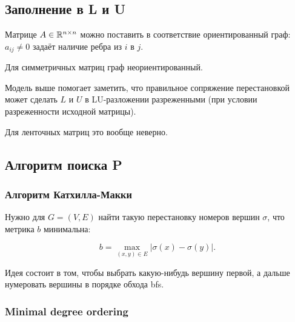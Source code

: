 \subsection{Заполнение в L и U}

Матрице $A \in \mathbb{R}^{n \times n}$ можно поставить в соответствие ориентированный
граф: $a_{ij} \ne 0$ задаёт наличие ребра из $i$ в $j$.

Для симметричных матриц граф неориентированный.

Модель выше помогает заметить, что правильное сопряжение перестановкой может
сделать $L$ и $U$ в LU-разложении разреженными (при условии разреженности
исходной матрицы).

Для ленточных матриц это вообще неверно.

\subsection{Алгоритм поиска P}

\subsubsection{Алгоритм Катхилла-Макки}

Нужно для $G = (V, E)$ найти такую перестановку номеров
вершин $\sigma$, что метрика $b$ минимальна:

\[
    b = \max_{(x, y) \in E} |\sigma(x) - \sigma(y)|.
\]

Идея состоит в том, чтобы выбрать какую-нибудь вершину первой, а дальше
нумеровать вершины в порядке обхода bfs.

\subsubsection{Minimal degree ordering}

